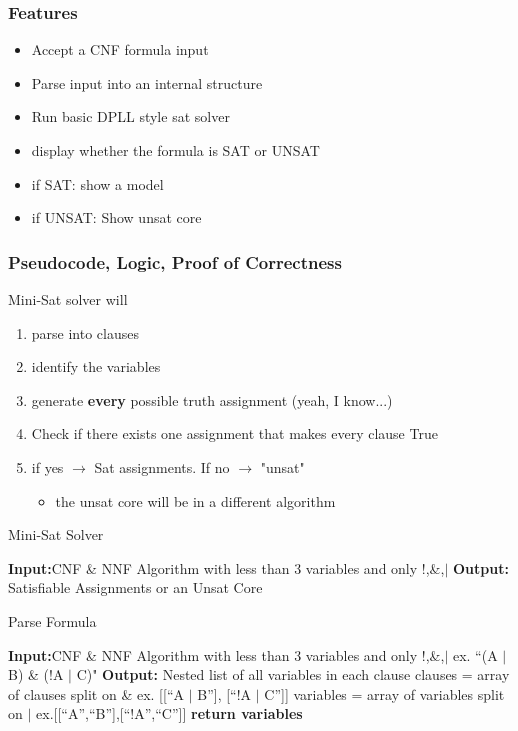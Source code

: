 \documentclass{article}
\begin{document}
\subsubsection{Features}
\begin{itemize}
    \item Accept a CNF formula input
    \item Parse input into an internal structure
    \item Run basic DPLL style sat solver
    \item display whether the formula is SAT or UNSAT
    \item if SAT: show a model
    \item if UNSAT: Show unsat core
\end{itemize}

\subsubsection{Pseudocode, Logic, Proof of Correctness}

Mini-Sat solver will
\begin{enumerate}
    \item parse into clauses
    \item identify the variables
    \item generate \textbf{every} possible truth assignment (yeah, I know...)
    \item Check if there exists one assignment that makes every clause True
    \item if yes $\rightarrow$ Sat assignments. If no $\rightarrow$ "unsat"
    \begin{itemize}
        \item the unsat core will be in a different algorithm
    \end{itemize}
\end{enumerate}

\begin{algorithm}
    \caption{Mini-Sat Solver}\label{alg:cap}
    \begin{algorithmic}
    \State \textbf{Input:}CNF \& NNF Algorithm with less than 3 variables and only !,\&,$\vert$
    \State \textbf{Output:} Satisfiable Assignments or an Unsat Core

    \end{algorithmic}
    \end{algorithm}

    \begin{algorithm}
        \caption{Parse Formula}
        \begin{algorithmic}
        \State \textbf{Input:}CNF \& NNF Algorithm with less than 3 variables and only !,\&,$\vert$ \Comment ex. ``(A $\vert$ B) \& (!A $\vert$ C)"
        \State \textbf{Output:} Nested list of all variables in each clause
        \State clauses = array of clauses split on \& \Comment ex. [[``A $\vert$ B''], [``!A $\vert$ C'']]
        \State variables = array of variables split on $\vert$ \Comment ex.[[``A'',``B''],[``!A'',``C'']]
        \State \textbf{return variables} 
        \end{algorithmic}
    \end{algorithm}
\end{document}
